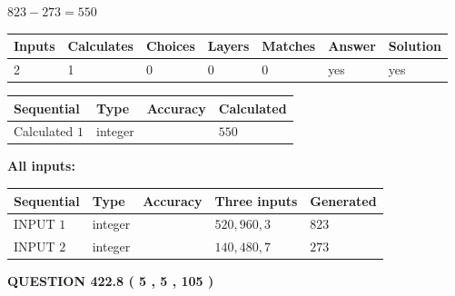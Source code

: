 \documentclass{ctexart}
\begin{document}
 

$ %
823 -  %
273=   %
550$
 
 
\noindent{}
 
 

 
   
   
   
   
\noindent\begin{tabular}{|l|l|l|l|l|l|l|}
 \hline
Inputs & Calculates & Choices & Layers & Matches & Answer & Solution \\ \hline
 2  & 
 1  & 
 0
  & 
 0  & 
 0  & 
  yes & 
  yes 
  \\ \hline
 \end{tabular}
   
   
   
   
\noindent{}
   
   
  
  
\noindent\begin{tabular}{|l|l|l|l|}
\hline
 Sequential & Type & Accuracy & Calculated \\ 
\hline
 
 
  Calculated $  1 $ & integer &  & 
  $ 550 $ 
 \\  \hline  
 \end{tabular}
   
   
   
   
\noindent\vspace{0.1in}\hspace{-0.08in} {\textbf{\Large{All inputs: }}}
   
   
  
  
\noindent\begin{tabular}{|l|l|l|l|l|}
\hline
 Sequential & Type & Accuracy & Three inputs & Generated \\ 
\hline
 
 
  INPUT $  1 $ & integer &  & $
 520
 , 
 960
 , 
 3
 $ & $ 823 $ 
 \\  \hline  
 
 
  INPUT $  2 $ & integer &  & $
 140
 , 
 480
 , 
 7
 $ & $ 273 $ 
 \\  \hline  
 \end{tabular}
   
   
  
\vspace{0.2in}
  
{\textbf{\Large{QUESTION
422.8 
 ( 5 , 5 , 105 )
}}}
  
\end{document}
